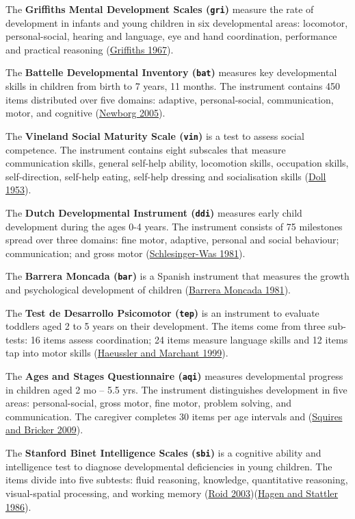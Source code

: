 \documentclass[
]{book}
\begin{document}
The \textbf{Griffiths Mental Development Scales (\texttt{gri})} measure the rate of development in infants and young children in six developmental areas: locomotor, personal-social, hearing and language, eye and hand coordination, performance and practical reasoning (\protect\hyperlink{ref-griffiths1967}{Griffiths 1967}).

The \textbf{Battelle Developmental Inventory (\texttt{bat})} measures key developmental skills in children from birth to 7 years, 11 months. The instrument contains 450 items distributed over five domains: adaptive, personal-social, communication, motor, and cognitive (\protect\hyperlink{ref-newborg2005}{Newborg 2005}).

The \textbf{Vineland Social Maturity Scale (\texttt{vin})} is a test to assess social competence. The instrument contains eight subscales that measure communication skills, general self-help ability, locomotion skills, occupation skills, self-direction, self-help eating, self-help dressing and socialisation skills (\protect\hyperlink{ref-doll1953}{Doll 1953}).

The \textbf{Dutch Developmental Instrument (\texttt{ddi})} measures early child development during the ages 0-4 years. The instrument consists of 75 milestones spread over three domains: fine motor, adaptive, personal and social behaviour; communication; and gross motor (\protect\hyperlink{ref-schlesinger1981}{Schlesinger-Was 1981}).

The \textbf{Barrera Moncada (\texttt{bar})} is a Spanish instrument that measures the growth and psychological development of children (\protect\hyperlink{ref-barrera1981}{Barrera Moncada 1981}).

The \textbf{Test de Desarrollo Psicomotor (\texttt{tep})} is an instrument to evaluate toddlers aged 2 to 5 years on their development. The items come from three sub-tests: 16 items assess coordination; 24 items measure language skills and 12 items tap into motor skills (\protect\hyperlink{ref-haeussler1999}{Haeussler and Marchant 1999}).

The \textbf{Ages and Stages Questionnaire (\texttt{aqi})} measures developmental progress in children aged 2 mo -- 5.5 yrs. The instrument distinguishes development in five areas: personal-social, gross motor, fine motor, problem solving, and communication. The caregiver completes 30 items per age intervals and (\protect\hyperlink{ref-squires2009}{Squires and Bricker 2009}).

The \textbf{Stanford Binet Intelligence Scales (\texttt{sbi})} is a cognitive ability and intelligence test to diagnose developmental deficiencies in young children. The items divide into five subtests: fluid reasoning, knowledge, quantitative reasoning, visual-spatial processing, and working memory (\protect\hyperlink{ref-roid2003}{Roid 2003})(\protect\hyperlink{ref-hagen1986}{Hagen and Stattler 1986}).
\end{document}
